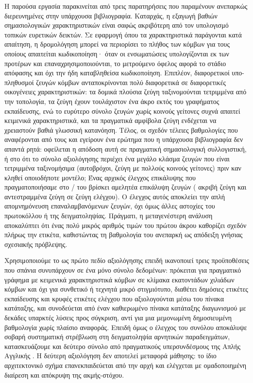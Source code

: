 Η παρούσα εργασία παρακινείται από τρεις παρατηρήσεις που παραμένουν ανεπαρκώς
διερευνημένες στην υπάρχουσα βιβλιογραφία.
Καταρχάς, η εξαγωγή βαθιών σημασιολογικών χαρακτηριστικών είναι σαφώς ακριβότερη
από τον υπολογισμό τοπικών ευρετικών δεικτών.
Σε εφαρμογή όπου τα χαρακτηριστικά
παράγονται κατά απαίτηση, η δρομολόγηση μπορεί να περιορίσει το πλήθος των κόμβων
για τους οποίους απαιτείται κωδικοποίηση· όταν οι ενσωματώσεις υπολογίζονται εκ των προτέρων και
επαναχρησιμοποιούνται, το μετρούμενο όφελος αφορά το στάδιο απόφασης και όχι την
ήδη καταβληθείσα κωδικοποίηση.
Επιπλέον, διαφορετικοί υπο-πληθυσμοί ζευγών κόμβων
ανταποκρίνονται πολύ διαφορετικά σε διαφορετικές οικογένειες χαρακτηριστικών: τα
δομικά πλούσια ζεύγη ταξινομούνται τετριμμένα από την τοπολογία, τα ζεύγη 
έχουν τουλάχιστον ένα άκρο εκτός του γραφήματος εκπαίδευσης, ενώ το ευρύτερο
σύνολο ζευγών χωρίς κοινούς γείτονες συχνά απαιτεί κειμενικά χαρακτηριστικά,
και τα πραγματικά αμφίβολα ζεύγη ενδέχεται να χρειαστούν βαθιά γλωσσική κατανόηση.
Τέλος, οι σχεδόν τέλειες βαθμολογίες που αναφέρονται από τους \textcite{phan2023link}
και \textcite{tran2023text} εγείρουν ένα ερώτημα που η υπάρχουσα
βιβλιογραφία δεν απαντά ρητά: οφείλεται η απόδοση αυτή σε πραγματική σημασιολογική
συλλογιστική, ή στο ότι το σύνολο αξιολόγησης περιέχει ένα μεγάλο κλάσμα ζευγών που
είναι τετριμμένα ταξινομήσιμα (αυτοβρόχοι, ζεύγη με πολλούς κοινούς γείτονες) πριν
καν κληθεί οποιοδήποτε μοντέλο; Ένας αρχικός έλεγχος επικάλυψης που πραγματοποιήσαμε
στο \texttt{}/\texttt{} του  βρίσκει
αμελητέα επικάλυψη ζευγών (\LeakageExact{} ακριβή ζεύγη και \LeakageReversed{} αντεστραμμένα ζεύγη σε \TestPairs{}
ζεύγη ελέγχου).
Ο έλεγχος αυτός αποκλείει την απλή απομνημόνευση
επαναλαμβανόμενων ζευγών, όχι όμως άλλες αστοχίες του πρωτοκόλλου ή της
δειγματοληψίας.
Πράγματι, η μεταγενέστερη ανάλυση αποκαλύπτει ότι ένας πολύ μικρός
αριθμός τιμών του πρώτου άκρου καθορίζει σχεδόν πλήρως την ετικέτα, καθιστώντας τη
βαθμολογία του  ανεπαρκή ως απόδειξη γνήσιας σχεσιακής πρόβλεψης.

Χρησιμοποιούμε το  ως πρώτο πεδίο αξιολόγησης επειδή ικανοποιεί τρεις
προϋποθέσεις που σπάνια συνυπάρχουν σε ένα μόνο σύνολο δεδομένων: πρόκειται για
πραγματικό γράφημα με κειμενικά χαρακτηριστικά κόμβων σε κλίμακα εκατοντάδων
χιλιάδων κόμβων και όχι για συνθετικό ή τεχνητά μικρό στιγμιότυπο, διαθέτει
δημόσιες ετικέτες εκπαίδευσης και κρυφές ετικέτες ελέγχου που αξιολογούνται μέσω
του πίνακα κατάταξης, και
συνοδεύεται από έναν καθιερωμένο πίνακα κατάταξης διαγωνισμού με δεκάδες υπαρκτές
λύσεις προς σύγκριση, αντί για μια μεμονωμένη δημοσιευμένη βαθμολογία χωρίς πλαίσιο
αναφοράς.
Επειδή όμως ο έλεγχος του συνόλου αποκάλυψε σοβαρή συστηματική στρέβλωση
στη δειγματοληψία αρνητικών παραδειγμάτων, κατασκευάζουμε και δεύτερο σύνολο από πραγματικούς
υπερσυνδέσμους της Απλής Αγγλικής .
Η δεύτερη αξιολόγηση δεν αποτελεί
μεταφορά μάθησης: το ίδιο αρχιτεκτονικό σχήμα επανεκπαιδεύεται από την αρχή και
ελέγχεται με ομαδοποιημένη διαίρεση και απόκρυψη της ακμής-στόχου.

